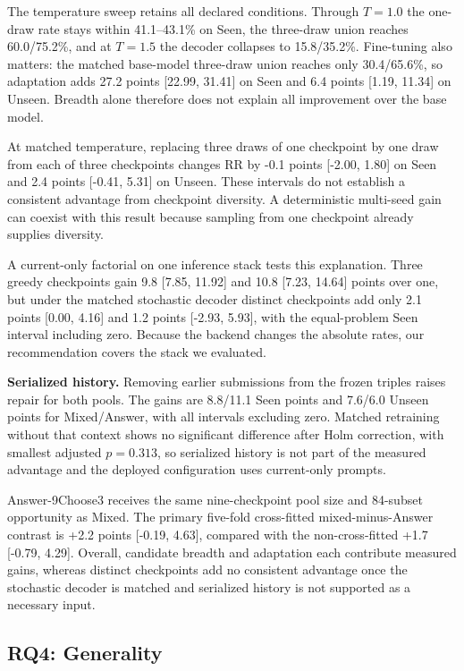 \documentclass[10pt,conference]{IEEEtran}
\begin{document}
The temperature sweep retains all declared conditions. Through \(T=1.0\) the one-draw rate stays within 41.1--43.1\% on Seen, the three-draw union reaches 60.0/75.2\%, and at \(T=1.5\) the decoder collapses to 15.8/35.2\%. Fine-tuning also matters: the matched base-model three-draw union reaches only 30.4/65.6\%, so adaptation adds 27.2 points [22.99, 31.41] on Seen and 6.4 points [1.19, 11.34] on Unseen. Breadth alone therefore does not explain all improvement over the base model.

At matched temperature, replacing three draws of one checkpoint by one draw from each of three checkpoints changes RR by -0.1 points [-2.00, 1.80] on Seen and 2.4 points [-0.41, 5.31] on Unseen. These intervals do not establish a consistent advantage from checkpoint diversity. A deterministic multi-seed gain can coexist with this result because sampling from one checkpoint already supplies diversity.

A current-only factorial on one inference stack tests this explanation. Three greedy checkpoints gain 9.8 [7.85, 11.92] and 10.8 [7.23, 14.64] points over one, but under the matched stochastic decoder distinct checkpoints add only 2.1 points [0.00, 4.16] and 1.2 points [-2.93, 5.93], with the equal-problem Seen interval including zero. Because the backend changes the absolute rates, our recommendation covers the stack we evaluated.

\noindent\textbf{Serialized history.} Removing earlier submissions from the frozen triples raises repair for both pools. The gains are 8.8/11.1 Seen points and 7.6/6.0 Unseen points for Mixed/Answer, with all intervals excluding zero. Matched retraining without that context shows no significant difference after Holm correction, with smallest adjusted \(p=0.313\), so serialized history is not part of the measured advantage and the deployed configuration uses current-only prompts.

Answer-9Choose3 receives the same nine-checkpoint pool size and 84-subset opportunity as Mixed. The primary five-fold cross-fitted mixed-minus-Answer contrast is +2.2 points [-0.19, 4.63], compared with the non-cross-fitted +1.7 [-0.79, 4.29]. Overall, candidate breadth and adaptation each contribute measured gains, whereas distinct checkpoints add no consistent advantage once the stochastic decoder is matched and serialized history is not supported as a necessary input.

\subsection{RQ4: Generality}
\end{document}
